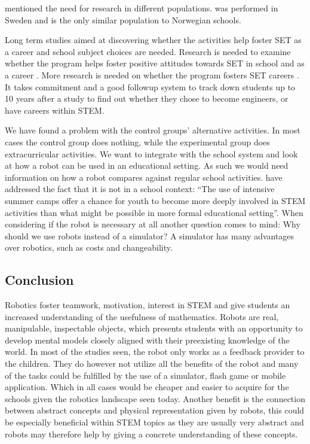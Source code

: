 \bigskip\noindent
{} mentioned the need for research in different populations.  was performed in Sweden and is the only similar population to Norwegian schools. %

\bigskip\noindent
Long term studies aimed at discovering whether the activities help foster SET as a career and school subject choices are needed. Research is needed to examine whether the program helps foster positive attitudes towards SET in school and as a career . More research is needed on whether the program fosters SET careers \cite{barker2007robotics}. It takes commitment and a good followup system to track down students up to 10 years after a study to find out whether they chose to become engineers, or have careers within STEM. %

\bigskip\noindent
We have found a problem with the control groups' alternative activities. In most cases the control group does nothing, while the experimental group does extracurricular activities. We want to integrate with the school system and look at how a robot can be used in an educational setting. As such we would need information on how a robot compares against regular school activities. 
 have addressed the fact that it is not in a school context: ``The use of intensive summer camps offer a chance for youth to become more deeply involved in STEM activities than what might be possible in more formal educational setting''. When considering if the robot is necessary at all another question comes to mind: Why should we use robots instead of a simulator? A simulator has many advantages over robotics, such as costs and changeability. %

\subsection*{Conclusion}\label{ch:literatureConclusion}
Robotics foster teamwork, motivation, interest in STEM and give students an increased understanding of the usefulness of mathematics. Robots are real, manipulable, inspectable objects, which presents students with an opportunity to develop mental models closely aligned with their preexisting knowledge of the world. In most of the studies seen, the robot only works as a feedback provider to the children. They do however not utilize all the benefits of the robot and many of the tasks could be fulfilled by the use of a simulator, flash game or mobile application. Which in all cases would be cheaper and easier to acquire for the schools given the robotics landscape seen today. Another benefit is the connection between abstract concepts and physical representation given by robots, this could be especially beneficial within STEM topics as they are usually very abstract and robots may therefore help by giving a concrete understanding of these concepts.

